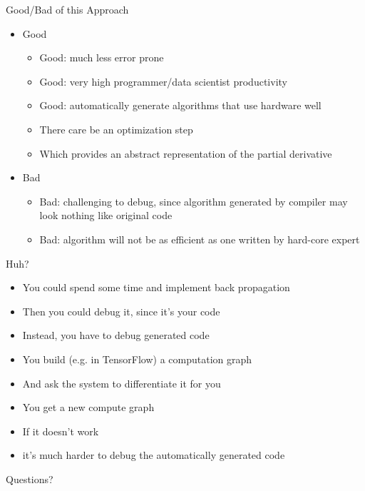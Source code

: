 \documentclass[aspectratio=169]{beamer}
\begin{document}
\begin{frame}{Good/Bad of this Approach}

\begin{itemize}
	\item Good
	\begin{itemize}
	\item Good: much less error prone
	\item Good: very high programmer/data scientist productivity
	\item Good: automatically generate algorithms that use hardware well
	\item There care be an optimization step
	\item Which provides an abstract representation of the partial derivative
	\end{itemize}
	\item Bad
	\begin{itemize}
	\item Bad: challenging to debug, since algorithm generated by compiler may look nothing like original code
	\item Bad: algorithm will not be as efficient as one written by hard-core expert
	\end{itemize}
\end{itemize}

\end{frame}

\begin{frame}{Huh?}


\begin{itemize}
\item You could spend some time and implement back propagation
\item Then you could debug it, since it's your code
\item Instead, you have to debug generated code
\item You build (e.g. in TensorFlow) a computation graph
\item And ask the system to differentiate it for you
\item You get a new compute graph
\item If it doesn't work
\item it's much harder to debug the automatically generated code
\end{itemize}

\end{frame}


\begin{frame}{Questions?}
\end{frame}
\end{document}
